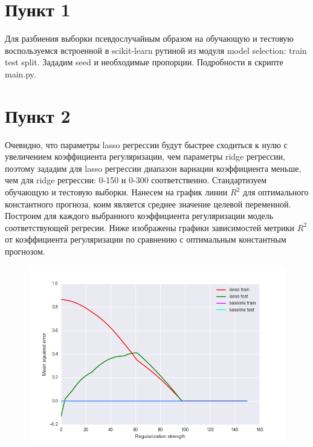 \documentclass[a4paper, 12pt, oneside]{scrartcl}
\numberwithin{equation}{section}
\numberwithin{table}{section}
\numberwithin{figure}{section}
\begin{document}
\section*{Пункт 1}
Для разбиения выборки псевдослучайным образом на обучающую и тестовую воспользуемся встроенной в scikit-learn рутиной из модуля model selection: 
train test split. Зададим seed и необходимые пропорции. Подробности в скрипте main.py.

\section*{Пункт 2}
Очевидно, что параметры lasso регрессии будут быстрее сходиться к нулю с увеличением коэффициента регуляризации, чем параметры ridge регрессии, 
поэтому зададим для lasso регрессии диапазон вариации коэффициента меньше, чем для ridge регрессии: 0-150 и 0-300 соответственно. Стандартизуем 
обучающую и тестовую выборки. Нанесем на график линии $ R^2 $ для оптимального константного прогноза, коим является среднее значение 
целевой переменной. Построим 
для каждого выбранного коэффициента регуляризации модель соответствующей регресии. Ниже изображены графики зависимостей метрики $ R^2 $ 
от коэффициента регуляризации по сравнению с оптимальным константным прогнозом.
\begin{figure}[h]
    \centering
    \includegraphics[width=\linewidth]{rss_lasso.png}
\end{figure}
\newline
\end{document}

